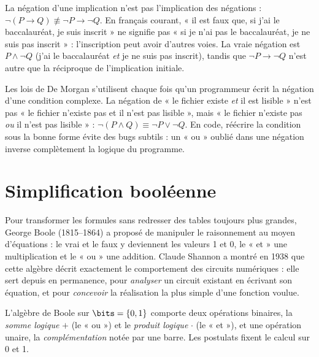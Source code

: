 \begin{attention}
La négation d'une implication n'est pas l'implication des négations : $\lnot(P \rightarrow Q) \not\equiv \lnot P \rightarrow \lnot Q$. En français courant, « il est faux que, si j'ai le baccalauréat, je suis inscrit » ne signifie pas « si je n'ai pas le baccalauréat, je ne suis pas inscrit » : l'inscription peut avoir d'autres voies. La vraie négation est $P \land \lnot Q$ (j'ai le baccalauréat \emph{et} je ne suis pas inscrit), tandis que $\lnot P \rightarrow \lnot Q$ n'est autre que la réciproque de l'implication initiale.
\end{attention}

\begin{remarque}
Les lois de De Morgan s'utilisent chaque fois qu'un programmeur écrit la négation d'une condition complexe. La négation de « le fichier existe \emph{et} il est lisible » n'est pas « le fichier n'existe pas et il n'est pas lisible », mais « le fichier n'existe pas \emph{ou} il n'est pas lisible » : $\lnot(P \land Q) \equiv \lnot P \lor \lnot Q$. En code, réécrire la condition sous la bonne forme évite des bugs subtils : un « ou » oublié dans une négation inverse complètement la logique du programme.
\end{remarque}

\section{Simplification booléenne}

Pour transformer les formules sans redresser des tables toujours plus grandes, George Boole (1815--1864) a proposé de manipuler le raisonnement au moyen d'équations : le vrai et le faux y deviennent les valeurs 1 et 0, le « et » une multiplication et le « ou » une addition. Claude Shannon a montré en 1938 que cette algèbre décrit exactement le comportement des circuits numériques : elle sert depuis en permanence, pour \emph{analyser} un circuit existant en écrivant son équation, et pour \emph{concevoir} la réalisation la plus simple d'une fonction voulue.

\begin{definition}
L'algèbre de Boole sur $\bits = \{0, 1\}$ comporte deux opérations binaires, la \emph{somme logique} $+$ (le « ou ») et le \emph{produit logique} $\cdot$ (le « et »), et une opération unaire, la \emph{complémentation} notée par une barre. Les postulats fixent le calcul sur 0 et 1.
\end{definition}

